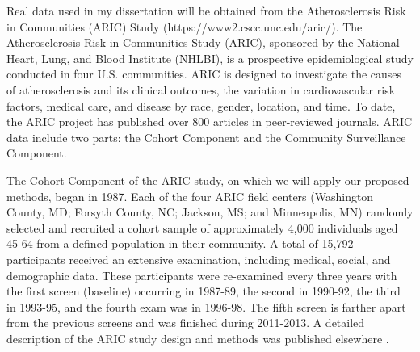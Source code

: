 \documentclass[12pt]{article}
\begin{document}
%
Real data used in my dissertation will be obtained from the Atherosclerosis Risk in Communities (ARIC) Study (https://www2.cscc.unc.edu/aric/). The Atherosclerosis Risk in Communities Study (ARIC), sponsored by the National Heart, Lung, and Blood Institute (NHLBI), is a prospective epidemiological study conducted in four U.S. communities. ARIC is designed to investigate the causes of atherosclerosis and its clinical outcomes, the variation in cardiovascular risk factors, medical care, and disease by race, gender, location, and time. To date, the ARIC project has published over 800 articles in peer-reviewed journals. ARIC data include two parts: the Cohort Component and the Community Surveillance Component.

The Cohort Component of the ARIC study, on which we will apply our proposed methods, began in 1987. Each of the four ARIC field centers (Washington County, MD; Forsyth County, NC; Jackson, MS; and Minneapolis, MN) randomly selected and recruited a cohort sample of approximately 4,000 individuals aged 45-64 from a defined population in their community. A total of 15,792 participants received an extensive examination, including medical, social, and demographic data. These participants were re-examined every three years with the first screen (baseline) occurring in 1987-89, the second in 1990-92, the third in 1993-95, and the fourth exam was in 1996-98. The fifth screen is farther apart from the previous screens and was finished during 2011-2013. A detailed description of the ARIC study design and methods was published elsewhere \cite{Investigators1989}.

\end{document}
